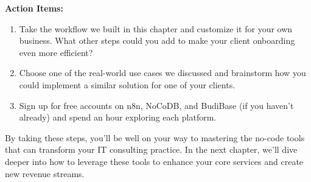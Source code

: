 \textbf{Action Items:}
\begin{enumerate}
    \item Take the workflow we built in this chapter and customize it for your own business. What other steps could you add to make your client onboarding even more efficient?
    \item Choose one of the real-world use cases we discussed and brainstorm how you could implement a similar solution for one of your clients.
    \item Sign up for free accounts on n8n, NoCoDB, and BudiBase (if you haven't already) and spend an hour exploring each platform.
\end{enumerate}

By taking these steps, you'll be well on your way to mastering the no-code tools that can transform your IT consulting practice. In the next chapter, we'll dive deeper into how to leverage these tools to enhance your core services and create new revenue streams.